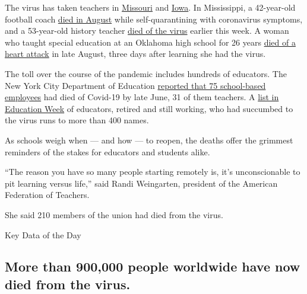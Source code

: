 The virus has taken teachers in
\href{https://www.kmov.com/news/34-year-old-potosi-teacher-dies-after-3-week-battle-with-covid-kids-absolutely-adored/article_e7139b52-f1ed-11ea-ab1a-cf2e904c1549.html}{Missouri}
and
\href{https://www.weareiowa.com/article/news/health/coronavirus/des-moines-public-schools-ruby-van-meter-teacher-dies-from-coronavirus/524-124fb714-1268-40c3-9276-849cab42d08c}{Iowa}.
In Mississippi, a 42-year-old football coach
\href{https://www.wtva.com/content/sports/Lafayette-head-coach-remembers-Nacoma-James-572070401.html}{died
in August} while self-quarantining with coronavirus symptoms, and a
53-year-old history teacher
\href{https://www.wlox.com/2020/09/08/students-faculty-remember-vancleave-high-school-teacher-who-died-covid-complications/}{died
of the virus} earlier this week. A woman who taught special education at
an Oklahoma high school for 26 years
\href{https://ktul.com/news/local/tahlequah-moves-to-distance-learning-for-2-days-after-teacher-suddenly-dies}{died
of a heart attack} in late August, three days after learning she had the
virus.

The toll over the course of the pandemic includes hundreds of educators.
The New York City Department of Education
\href{https://www.schools.nyc.gov/about-us/news/covid-19-losses}{reported
that 75 school-based employees} had died of Covid-19 by late June, 31 of
them teachers. A
\href{https://www.edweek.org/ew/section/multimedia/educators-weve-lost-to-the-coronavirus.html}{list
in Education Week} of educators, retired and still working, who had
succumbed to the virus runs to more than 400 names.

As schools weigh when --- and how --- to reopen, the deaths offer the
grimmest reminders of the stakes for educators and students alike.

``The reason you have so many people starting remotely is, it's
unconscionable to pit learning versus life,'' said Randi Weingarten,
president of the American Federation of Teachers.

She said 210 members of the union had died from the virus.

Key Data of the Day

\hypertarget{more-than-900000-people-worldwide-have-now-died-from-the-virus}{%
\subsection{More than 900,000 people worldwide have now died from the
virus.}\label{more-than-900000-people-worldwide-have-now-died-from-the-virus}}

